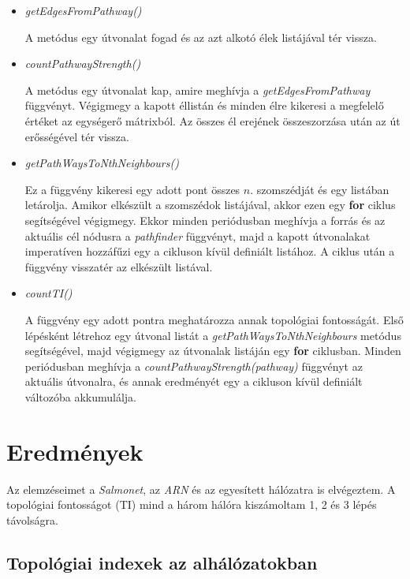 \documentclass[a4paper,12pt]{article}
\begin{document}
\begin{itemize}
			\item \textit{getEdgesFromPathway()}
			
			A metódus egy útvonalat fogad és az azt alkotó élek listájával tér vissza. 
			
			\item \textit{countPathwayStrength()}
			
			A metódus egy útvonalat kap, amire meghívja a \textit{getEdgesFromPathway} függvényt. Végigmegy a kapott éllistán és minden élre kikeresi a megfelelő értéket az egységerő mátrixból. Az összes él erejének összeszorzása után az út erősségével tér vissza.
			
			\item \textit{getPathWaysToNthNeighbours()}
			
			Ez a függvény kikeresi egy adott pont összes $n$. szomszédját és egy listában letárolja. Amikor elkészült a szomszédok listájával, akkor ezen egy \textbf{for} ciklus segítségével végigmegy. Ekkor minden periódusban meghívja a forrás és az aktuális cél nódusra a \textit{pathfinder} függvényt, majd a kapott útvonalakat imperatíven hozzáfűzi egy a cikluson kívül definiált listához. A ciklus után a függvény visszatér az elkészült listával.
			
			\item \textit{countTI()}
			
			A függvény egy adott pontra meghatározza annak topológiai fontosságát. Első lépésként létrehoz egy útvonal listát a \textit{getPathWaysToNthNeighbours} metódus segítségével, majd végigmegy az útvonalak listáján egy \textbf{for} ciklusban. Minden periódusban meghívja a \textit{countPathwayStrength(pathway)} függvényt az aktuális útvonalra, és annak eredményét egy a cikluson kívül definiált változóba akkumulálja.
			
		\end{itemize}
		\pagebreak


\section{Eredmények}

	Az elemzéseimet a \textit{Salmonet}, az \textit{ARN} és az egyesített hálózatra is elvégeztem. A topológiai fontosságot (TI) mind a három hálóra kiszámoltam 1, 2 és 3 lépés távolságra. 
	
	\subsection{Topológiai indexek az alhálózatokban}
\end{document}
